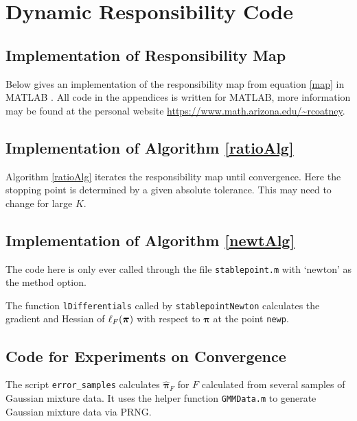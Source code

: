 \renewcommand{\thesubsection}{\Alph{subsection}}

\chapter{Dynamic Responsibility Code}\label{app:DRcode}
\section{Implementation of Responsibility Map}\label{code:map}
Below gives an implementation of the responsibility map from equation \eqref{map} in MATLAB \cite{MATLAB:2020a}. All code in the appendices is written for MATLAB, more information may be found at the personal website \url{https://www.math.arizona.edu/~rcoatney}.



\newpage
\section{Implementation of Algorithm \ref{ratioAlg}}\label{code:ratioAlg}
Algorithm \ref{ratioAlg} iterates the responsibility map until convergence.  Here the stopping point is determined by a given absolute tolerance.  This may need to change for large $K$.


\newpage
\section{Implementation of Algorithm \ref{newtAlg}}\label{code:newtAlg}
The code here is only ever called through the file \verb|stablepoint.m| with `newton' as the method option. 


The function \verb|lDifferentials| called by \verb|stablepointNewton| calculates the gradient and Hessian of \( \ell_{F}({\bm\pi}) \) with respect to \( \bm\pi \) at the point \verb|newp|.

			
\section{Code for Experiments on Convergence}
The script \verb|error_samples| calculates \( \hat{\bm \pi}_F \) for \( F \) calculated from several samples of Gaussian mixture data. It uses the helper function \verb|GMMData.m| to generate Gaussian mixture data via PRNG.

